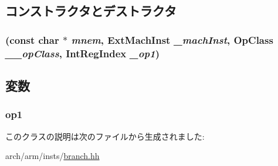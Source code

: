 \subsection{コンストラクタとデストラクタ}
\hypertarget{classArmISA_1_1BranchReg_ac595e065da0b87321e3e337c67675e45}{
\subsubsection[{BranchReg}]{ (const char $\ast$ {\em mnem}, \/  {\bf ExtMachInst} {\em \_\-machInst}, \/  OpClass {\em \_\-\_\-opClass}, \/  {\bf IntRegIndex} {\em \_\-op1})}}
\label{classArmISA_1_1BranchReg_ac595e065da0b87321e3e337c67675e45}



\begin{DoxyCode}
85                                 :
86         PredOp(mnem, _machInst, __opClass), op1(_op1)
87     {}
};
\end{DoxyCode}


\subsection{変数}
\hypertarget{classArmISA_1_1BranchReg_a4c465c43ad568f8bcf8ae71480e9cfea}{
\subsubsection[{op1}]{ {\bf op1}}}
\label{classArmISA_1_1BranchReg_a4c465c43ad568f8bcf8ae71480e9cfea}


このクラスの説明は次のファイルから生成されました:\begin{DoxyCompactItemize}
\item 
arch/arm/insts/\hyperlink{arm_2insts_2branch_8hh}{branch.hh}\end{DoxyCompactItemize}
